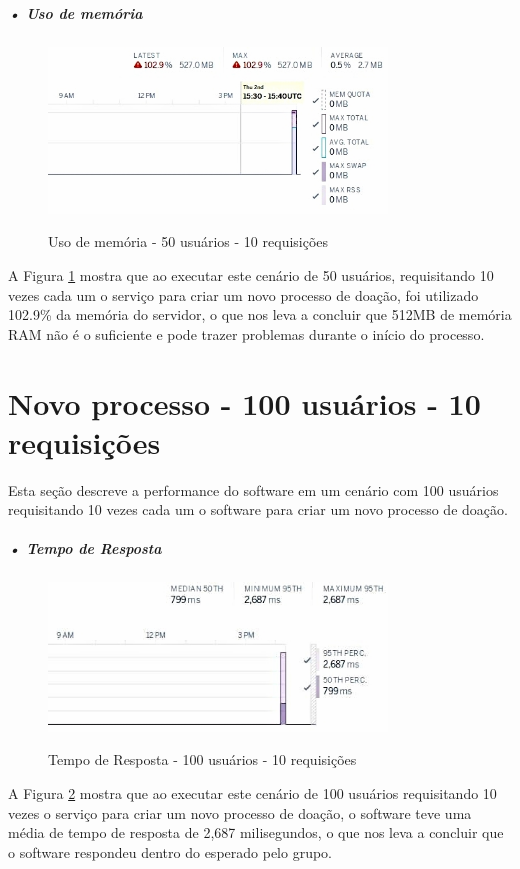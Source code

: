 \documentclass[portuguese,oneside]{tcc}
\begin{document}
\subparagraph{• Uso de memória}
\begin{figure}[htp]
\centering
\caption{Uso de memória - 50 usuários - 10 requisições}
\includegraphics[width=9cm]{50-10-memory}
\label{fig:uso-de-memoria-50-10}
\end{figure}

A Figura \ref{fig:uso-de-memoria-50-10} mostra que ao executar este cenário de 50 usuários, requisitando 10 vezes cada um o serviço para criar um novo processo de doação, foi utilizado 102.9\% da memória do servidor, o que nos leva a concluir que 512MB de memória RAM não é o suficiente e pode trazer problemas durante o início do processo.


\section{Novo processo - 100 usuários - 10 requisições}
Esta seção descreve a performance do software em um cenário com 100 usuários requisitando 10 vezes cada um o software para criar um novo processo de doação.

\subparagraph{• Tempo de Resposta}
\begin{figure}[htp]
\centering
\caption{Tempo de Resposta - 100 usuários - 10 requisições}
\includegraphics[width=9cm]{100-10-response-time}
\label{fig:tempo-reposta-100-10}
\end{figure}

A Figura \ref{fig:tempo-reposta-100-10} mostra que ao executar este cenário de 100 usuários requisitando 10 vezes o serviço para criar um novo processo de doação, o software teve uma média de tempo de resposta de 2,687 milisegundos, o que nos leva a concluir que o software respondeu dentro do esperado pelo grupo.
\end{document}
